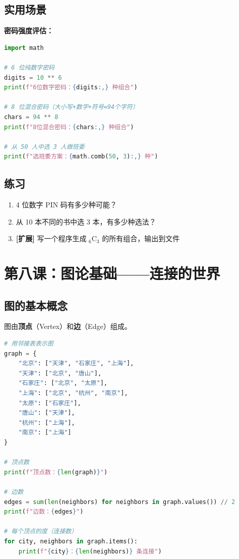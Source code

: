 \documentclass[a4paper,12pt]{ctexart}
\begin{document}
\subsection*{实用场景}

\textbf{密码强度评估：}

\begin{lstlisting}[language=Python]
import math

# 6 位纯数字密码
digits = 10 ** 6
print(f"6位数字密码：{digits:,} 种组合")

# 8 位混合密码（大小写+数字+符号=94个字符）
chars = 94 ** 8
print(f"8位混合密码：{chars:,} 种组合")

# 从 50 人中选 3 人做班委
print(f"选班委方案：{math.comb(50, 3):,} 种")
\end{lstlisting}

\subsection*{练习}

\begin{enumerate}
  \item 4 位数字 PIN 码有多少种可能？
  \item 从 10 本不同的书中选 3 本，有多少种选法？
  \item \textbf{[扩展]} 写一个程序生成 ${}_6\text{C}_3$ 的所有组合，输出到文件
\end{enumerate}

\section*{第八课：图论基础——连接的世界}

\subsection*{图的基本概念}

图由\textbf{顶点}（Vertex）和\textbf{边}（Edge）组成。

\begin{lstlisting}[language=Python]
# 用邻接表表示图
graph = {
    "北京": ["天津", "石家庄", "上海"],
    "天津": ["北京", "唐山"],
    "石家庄": ["北京", "太原"],
    "上海": ["北京", "杭州", "南京"],
    "太原": ["石家庄"],
    "唐山": ["天津"],
    "杭州": ["上海"],
    "南京": ["上海"]
}

# 顶点数
print(f"顶点数：{len(graph)}")

# 边数
edges = sum(len(neighbors) for neighbors in graph.values()) // 2
print(f"边数：{edges}")

# 每个顶点的度（连接数）
for city, neighbors in graph.items():
    print(f"{city}：{len(neighbors)} 条连接")
\end{lstlisting}
\end{document}
